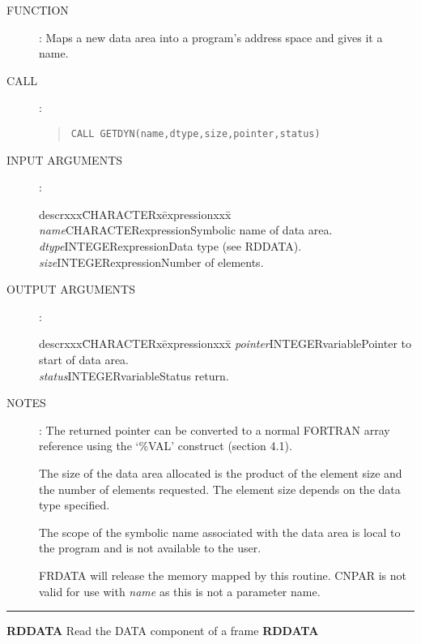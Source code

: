 \begin{description}
\item [FUNCTION]:
Maps a new data area into a program's address space and gives it a name.
\item [CALL]:
\begin{quote}
{\tt CALL GETDYN(name,dtype,size,pointer,status)}
\end{quote}
\item [INPUT ARGUMENTS]:
\begin{tabbing}
descrxxx\=CHARACTERx\=expressionxxx\=\kill
{\em name}\>CHARACTER\>expression\>Symbolic name of data area.\\
{\em dtype}\>INTEGER\>expression\>Data type (see RDDATA).\\
{\em size}\>INTEGER\>expression\>Number of elements.
\end{tabbing}
\item [OUTPUT ARGUMENTS]:
\begin{tabbing}
descrxxx\=CHARACTERx\=expressionxxx\=\kill
{\em pointer}\>INTEGER\>variable\>Pointer to start of data area.\\
{\em status}\>INTEGER\>variable\>Status return.
\end{tabbing}
\item [NOTES]:
The returned pointer can be converted to a normal FORTRAN array reference using
the `\%VAL' construct (section 4.1).

The size of the data area allocated is the product of the element size and the
number of elements requested.
The element size depends on the data type specified.

The scope of the symbolic name associated with the data area is local to the
program and is not available to the user.

FRDATA will release the memory mapped by this routine.
CNPAR is not valid for use with {\em name} as this is not a parameter name.
\end{description}
\rule{\textwidth}{0.3mm}
{\Large {\bf RDDATA} \hfill Read the DATA component of a frame \hfill {\bf RDDATA}}
